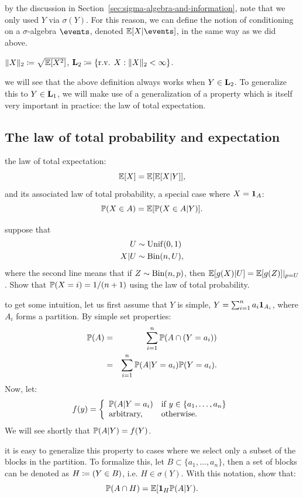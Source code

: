 \documentclass{article}
\begin{document}
 by the discussion in Section~\ref{sec:sigma-algebra-and-information}, note that we only used $Y$ via $\sigma(Y)$. For this reason, we can define the notion of conditioning on a $\sigma$-algebra $\events$, denoted $\E[X|\events]$, in the same way as we did above.

 $\|X\|_2 \defeq \sqrt{\E[X^2]}$, $\L_2 \defeq \{\text{r.v. } X : \|X\|_2 < \infty\}$.

 we will see that the above definition always works when $Y \in \L_2$. To generalize this to $Y \in \L_1$, we will make use of a generalization of a property which is itself very important in practice: the law of total expectation.


\subsection{The law of total probability and expectation}

 the law of total expectation:
\[ \E[X] = \E[\E[X|Y]], \]
and its associated law of total probability, a special case where $X = \1_A$:
\[ \P(X \in A) = \E[ \P(X \in A|Y) ]. \]

 suppose that
\begin{eqnarray*}
U &\sim \Unif(0,1) \\
X | U &\sim \Bin(n, U),
\end{eqnarray*}
where the second line means that if $Z \sim \Bin(n,p)$, then $\E[g(X) | U] = \E[g(Z)]|_{p=U}$. Show that $\P(X = i) = 1/(n+1)$ using the law of total probability. 

 to get some intuition, let us first assume that $Y$ is simple, $Y = \sum_{i=1}^n a_i \1_{A_i}$, where $A_i$ forms a partition. By simple set properties:
\begin{eqnarray*}
\P(A) &=& \sum_{i=1}^n \P(A \cap (Y=a_i)) \\
&=& \sum_{i=1}^n \P(A|Y=a_i) \P(Y = a_i).
\end{eqnarray*}
Now, let: 
\begin{equation} 
f(y) = \bracearraycond{
  \P(A|Y=a_i) &\text{if }y\in\{a_1, \dots, a_n\} \\ 
  \text{arbitrary,} & \text{otherwise.}
}
\end{equation}
We will see shortly that $\P(A|Y) = f(Y)$.

 it is easy to generalize this property to cases where we select only a subset of the blocks in the partition. To formalize this, let $B \subset \{a_1, \dots, a_n\}$, then a set of blocks can be denoted as $H \defeq (Y \in B)$, i.e. $H \in \sigma(Y)$. With this notation, show that:
\[ \P(A \cap H) = \E[ \1_H \P(A | Y). \]
\end{document}
